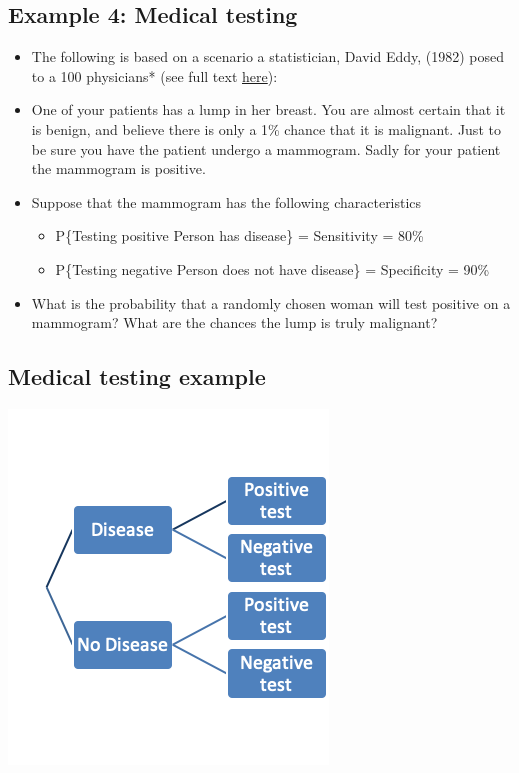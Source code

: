 \documentclass[
]{book}
\providecommand{\tightlist}{%
  \setlength{\itemsep}{0pt}\setlength{\parskip}{0pt}}
\begin{document}
\hypertarget{example-4-medical-testing}{%
\subsection{Example 4: Medical testing}\label{example-4-medical-testing}}

\begin{itemize}
\tightlist
\item
  The following is based on a scenario a statistician, David Eddy, (1982) posed to a 100 physicians* (see full text \href{http://personal.lse.ac.uk/robert49/teaching/mm/articles/Eddy1982_ProbReasoningInClinicalMedicine.pdf}{here}):
\item
  One of your patients has a lump in her breast. You are almost certain that it is benign, and believe there is only a 1\% chance that it is malignant. Just to be sure you have the patient undergo a mammogram. Sadly for your patient the mammogram is positive.
\item
  Suppose that the mammogram has the following characteristics

  \begin{itemize}
  \tightlist
  \item
    P\{Testing positive \textbar{} Person has disease\} = Sensitivity = 80\%
  \item
    P\{Testing negative \textbar{} Person does not have disease\} = Specificity = 90\%
  \end{itemize}
\item
  What is the probability that a randomly chosen woman will test positive on a mammogram? What are the chances the lump is truly malignant?
\end{itemize}

\hypertarget{medical-testing-example}{%
\subsection{Medical testing example}\label{medical-testing-example}}

\includegraphics[width=0.5\linewidth]{./2_29}
\end{document}

